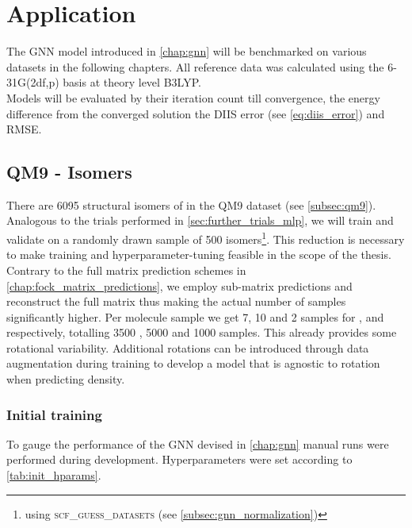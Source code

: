 \chapter{Application}
\label{chap:application}
The GNN model introduced in \autoref{chap:gnn} will be benchmarked on various datasets in the following chapters. All reference data was calculated using the 6-31G(2df,p) basis at theory level B3LYP. \\

Models will be evaluated by their iteration count till convergence, the energy difference from the converged solution the DIIS error (see \autoref{eq:diis_error}) and RMSE. 

\section{QM9 -  Isomers}
\label{sec:qm9_isomers_benchmark}
There are 6095 structural isomers of  in the QM9 dataset (see \autoref{subsec:qm9}). Analogous to the trials performed in \autoref{sec:further_trials_mlp}, we will train and validate on a randomly drawn sample of 500 isomers\footnote{using \textsc{scf\_guess\_datasets} (see \autoref{subsec:gnn_normalization})}. This reduction is necessary to make training and hyperparameter-tuning feasible in the scope of the thesis. Contrary to the full matrix prediction schemes in \autoref{chap:fock_matrix_predictions}, we employ sub-matrix predictions and reconstruct the full matrix thus making the actual number of samples significantly higher. Per molecule sample we get 7, 10 and 2 samples for ,  and  respectively, totalling 3500 , 5000  and 1000  samples. This already provides some rotational variability. Additional rotations can be introduced through data augmentation during training to develop a model that is agnostic to rotation when predicting density.\\

\subsection{Initial training}
\label{subsec:qm9_isomers_initial}
To gauge the performance of the GNN devised in \autoref{chap:gnn} manual runs were performed during development. Hyperparameters were set according to \autoref{tab:init_hparams}. 

